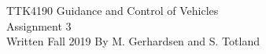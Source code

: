\documentclass[a4paper]{article}
\begin{document}
\begin{titlepage}
\begin{center}
\Large TTK4190 Guidance and Control of Vehicles \\
\vspace{10pt}
\Large Assignment 3 \\
\vspace{10pt}
\large Written Fall 2019 By M. Gerhardsen and S. Totland
\end{center}
\end{titlepage}






\end{document}
